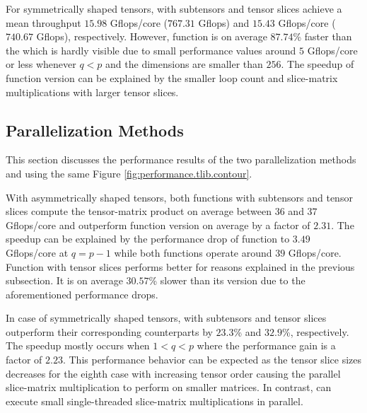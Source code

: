 For symmetrically shaped tensors,  with subtensors and tensor slices achieve a mean throughput $15.98$ Gflops/core ($767.31$ Gflops) and $15.43$ Gflops/core ($740.67$ Gflops), respectively.
However, function  is on average $87.74$\% faster than the  which is hardly visible due to small performance values around $5$ Gflops/core or less whenever $q<p$ and the dimensions are smaller than $256$.
The speedup of function  version can be explained by the smaller loop count and slice-matrix multiplications with larger tensor slices.


\subsection{Parallelization Methods}
This section discusses the performance results of the two parallelization methods  and  using the same Figure \ref{fig:performance.tlib.contour}.

With asymmetrically shaped tensors, both  functions with subtensors and tensor slices compute the tensor-matrix product on average between $36$ and $37$ Gflops/core and outperform function \allowbreak{} version on average by a factor of $2.31$.
The speedup can be explained by the performance drop of function \allowbreak{} to $3.49$ Gflops/core at $q=p-1$ while both  functions operate around $39$ Gflops/core.
Function  with tensor slices performs better for reasons explained in the previous subsection.
It is on average $30.57$\% slower than its  version due to the aforementioned performance drops.

In case of symmetrically shaped tensors,  with subtensors and tensor slices outperform their corresponding  counterparts by $23.3$\% and $32.9$\%, respectively.
The speedup mostly occurs when $1<q<p$ where the performance gain is a factor of $2.23$.
This performance behavior can be expected as the tensor slice sizes decreases for the eighth case with increasing tensor order causing the parallel slice-matrix multiplication to perform on smaller matrices.
In contrast,  can execute small single-threaded slice-matrix multiplications in parallel.

